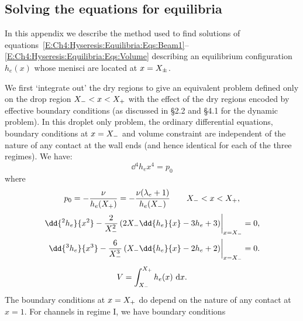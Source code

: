 \begin{subappendices}
\renewcommand{\thesection}{\Alph{section}}

\section{Solving the equations for equilibria}\label{A:Ch4:FindingEquilibria}
In this appendix we describe the method used to find solutions of equations~\eqref{E:Ch4:Hyseresis:Equilibria:Eqs:Beam1}--\eqref{E:Ch4:Hyseresis:Equilibria:Eqs:Volume} describing an equilibrium configuration $h_e(x)$ whose menisci are located at $x = X_{\pm}$.

We first `integrate out' the dry regions to give an equivalent problem defined only on the drop region $X_{-} < x < X_{+}$ with the effect of the dry regions encoded by effective boundary conditions (as discussed in \S2.2 and \S4.1 for the dynamic problem). In this droplet only problem, the ordinary differential equations, boundary conditions at $x = X_{-}$ and volume constraint are independent of the nature of any contact at the wall ends (and hence identical for each of the three regimes). We have:
\begin{equation}\label{A:E:Ch4:FindingEquilibria:beam}
\dd{^4 h_e}{x^4} = p_0
\end{equation}
where
\begin{equation}\label{A:E:Ch4:FindingEquilibria:p0}
p_0 =- \frac{\nu}{h_e(X_{+})} = - \frac{\nu(\lambda_e+1)}{h_e(X_{-})} \qquad X_{-} < x< X_{+},
\end{equation}
\begin{align}
\left.\dd{^2 h_e}{x^2} - \frac{2}{\xlefteq^2}\left(2\xlefteq \dd{h_e}{x} - 3h_e+3\right)\right|_{x = \xlefteq} &= 0, \label{A:E:Ch4:FindingEquilibria:EffBC_xl1}\\
\left.\dd{^3 h_e}{x^3} - \frac{6}{\xlefteq^3}\left(\xlefteq \dd{h_e}{x} - 2h_e+2\right)\right|_{x = \xlefteq} &= 0.\label{A:E:Ch4:FindingEquilibria:EffBC_xl2}
\end{align}
\begin{equation}\label{A:E:Ch4:FindingEquilibria:Volume}
V = \int_{X_{-}}^{X_{+}}h_e(x)~\mathrm{d}x.
\end{equation}
The boundary conditions at $x = X_{+}$ do depend on the nature of any contact at $x = 1$. For channels in regime I, we have boundary conditions
\begin{equation}\label{A:E:Ch4:FindingEquilibria:EffBC_xu_regimeI}

\end{equation}
\end{subappendices}
